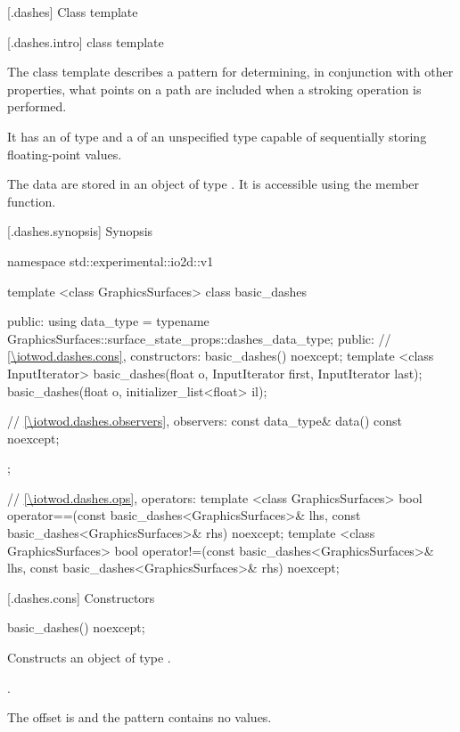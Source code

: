 
 [\iotwod.dashes] {Class template }

 [\iotwod.dashes.intro] { class template}

\pnum
{}%
The class template  describes a pattern for determining, in conjunction with other properties, what points on a path are included when a stroking operation is performed.

\pnum
It has an  of type  and a  of an unspecified type capable of sequentially storing floating-point values.

\pnum
The data are stored in an object of type . It is accessible using the  member function.

 [\iotwod.dashes.synopsis] {Synopsis}

\begin{codeblock}
namespace std::experimental::io2d::v1 {
  template <class GraphicsSurfaces>
  class basic_dashes {
  public:
  using data_type = 
    typename GraphicsSurfaces::surface_state_props::dashes_data_type;
  public:
    // \ref{\iotwod.dashes.cons}, constructors:
    basic_dashes() noexcept;
    template <class InputIterator>
    basic_dashes(float o, InputIterator first, InputIterator last);
    basic_dashes(float o, initializer_list<float> il);

    // \ref{\iotwod.dashes.observers}, observers:
    const data_type& data() const noexcept;
  };

  // \ref{\iotwod.dashes.ops}, operators:
  template <class GraphicsSurfaces>
  bool operator==(const basic_dashes<GraphicsSurfaces>& lhs,
    const basic_dashes<GraphicsSurfaces>& rhs) noexcept;
  template <class GraphicsSurfaces>
  bool operator!=(const basic_dashes<GraphicsSurfaces>& lhs,
    const basic_dashes<GraphicsSurfaces>& rhs) noexcept;
}
\end{codeblock}

 [\iotwod.dashes.cons] {Constructors}

%
\begin{itemdecl}
basic_dashes() noexcept;
\end{itemdecl}
\begin{itemdescr}
\pnum
\effects
Constructs an object of type .

\pnum
\postconditions
{}.

\pnum
\remarks
The offset is  and the pattern contains no values.
\end{itemdescr}

